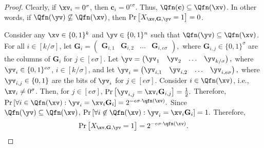 \begin{proof}
Clearly, if $\xv_i = 0^{\sigma}$, then $\mathbf{c}_i = 0^{e\sigma}$. Thus, $\Qfn(\mathbf{c}) \subseteq \Qfn(\xv)$. In other words, if $\Qfn(\yv) \not\subseteq \Qfn(\xv)$, then $\Pr\left[X_{\xv, \mathbf{G}, \yv}=1\right]=0$.

Consider any $\xv\in \{0,1\}^k$ and $\yv \in \{0,1\}^n$ such that $\Qfn(\yv) \subseteq \Qfn(\xv)$. For all $i\in[k/\sigma]$, let
$
    \mathbf{G}_i = \left(\begin{matrix}\mathbf{G}_{i,1} & \mathbf{G}_{i,2} &\ldots&\mathbf{G}_{i,e\sigma}\end{matrix}\right),
$
where $\mathbf{G}_{i,j} \in \{0,1\}^{\sigma}$ are the columns of $\mathbf{G}_i$ for $j \in [e\sigma]$. Let 
$
    \yv = \left(\begin{matrix}\yv_1 & \yv_2 &\ldots&\yv_{k/\sigma}\end{matrix}\right),
$
where $\yv_i \in \{0,1\}^{e\sigma}$, $i \in [k/ \sigma]$, and let 
$
    \yv_i = \left(\begin{matrix}\yv_{i,1} & \yv_{i,2} &\ldots&\yv_{i,e\sigma}\end{matrix}\right),
$
where $\yv_{i,j} \in \{0,1\}$ are the bits of $\yv_i$ for $j \in [e\sigma]$. Consider $i \in \Qfn(\xv)$, i.e., $\xv_{i} \ne 0^{\sigma}$. Then, for $j \in [e\sigma]$,
$
    \Pr\left[\yv_{i,j}=\xv_i\mathbf{G}_{i,j}\right]=\frac{1}{2}.
$
Therefore,
$
    \Pr\left[\forall i \in \Qfn(\xv) : \yv_{i}=\xv_i\mathbf{G}_{i}\right]=2^{-e\sigma\cdot\qfn(\xv)}.
$
Since $\Qfn(\yv) \subseteq \Qfn(\xv)$, 
$
    \Pr\left[\forall i \not\in \Qfn(\xv) : \yv_{i}=\xv_i\mathbf{G}_{i}\right]=1.
$
Therefore,$$
\Pr\left[X_{\xv, \mathbf{G}, \yv}=1\right]=2^{-e\sigma\cdot\qfn(\xv)}.$$
 
\end{proof}

